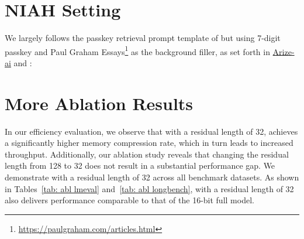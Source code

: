 \begin{algorithm}[h!]
  \caption{The \kivi{} Prefill \& Decoding Algorithm}
  \label{algo: kivi}
\end{algorithm}

\newpage
\section{NIAH Setting}
\label{app: niah}

We largely follows the passkey retrieval prompt template of \citet{mohtashami2023passkey} but using 7-digit passkey and Paul Graham Essays\footnote{\url{https://paulgraham.com/articles.html}} as the background filler, as set forth in \href{https://github.com/gkamradt/LLMTest_NeedleInAHaystack}{Arize-ai} and \citet{reid2024gemini}:







\section{More Ablation Results}
\label{app: abl}

In our efficiency evaluation, we observe that with a residual length of 32, \kivi{} achieves a significantly higher memory compression rate, which in turn leads to increased throughput. Additionally, our ablation study reveals that changing the residual length from 128 to 32 does not result in a substantial performance gap. We demonstrate \kivi{} with a residual length of 32 across all benchmark datasets. As shown in Tables~\ref{tab: abl lmeval} and~\ref{tab: abl longbench}, \kivi{} with a residual length of 32 also delivers performance comparable to that of the 16-bit full model.

